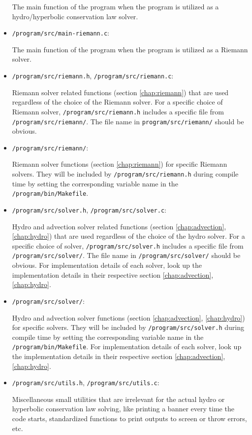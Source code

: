 \begin{itemize}
			The main function of the program when the program is utilized as a hydro/hyperbolic conservation law solver.
			
	\item 	\texttt{/program/src/main-riemann.c}:
			
			The main function of the program when the program is utilized as a Riemann solver.
			
			
	\item 	\texttt{/program/src/riemann.h}, \texttt{/program/src/riemann.c}:
	
			Riemann solver related functions (section \ref{chap:riemann}) that are used regardless of the choice of the Riemann solver.
			For a specific choice of Riemann solver, \texttt{/program/src/riemann.h} includes a specific file from \texttt{/program/src/riemann/}.
			The file name in \texttt{program/src/riemann/} should be obvious.
			
	\item 	\texttt{/program/src/riemann/}:
	
			Riemann solver functions (section \ref{chap:riemann}) for specific Riemann solvers.
			They will be included by \texttt{/program/src/riemann.h} during compile time by setting the corresponding variable name in the \texttt{/program/bin/Makefile}.

	\item 	\texttt{/program/src/solver.h}, \texttt{/program/src/solver.c}:
	
			Hydro and advection solver related functions (section \ref{chap:advection}, \ref{chap:hydro}) that are used regardless of the choice of the hydro solver.
			For a specific choice of solver, \texttt{/program/src/solver.h} includes a specific file from \texttt{/program/src/solver/}.
			The file name in \texttt{/program/src/solver/} should be obvious.
			For implementation details of each solver, look up the implementation details in their respective section \ref{chap:advection}, \ref{chap:hydro}.
			
	\item 	\texttt{/program/src/solver/}:
	
			Hydro and advection solver functions (section \ref{chap:advection}, \ref{chap:hydro}) for specific  solvers.
			They will be included by \texttt{/program/src/solver.h} during compile time by setting the corresponding variable name in the \texttt{/program/bin/Makefile}.
			For implementation details of each solver, look up the implementation details in their respective section \ref{chap:advection}, \ref{chap:hydro}.

	\item 	\texttt{/program/src/utils.h}, \texttt{/program/src/utils.c}:
	
			Miscellaneous small utilities that are irrelevant for the actual hydro or hyperbolic conservation law solving, like printing a banner every time the code starts, standardized functions to print outputs to screen or throw errors, etc.

\end{itemize}

	





